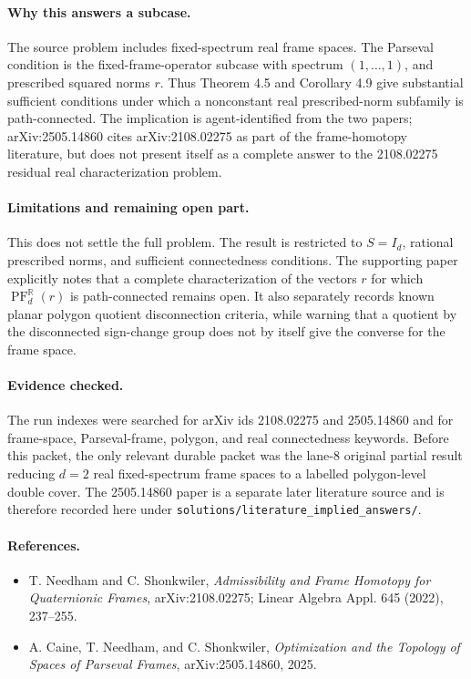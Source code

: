 \documentclass[11pt]{article}
\newcommand{\R}{\mathbb R}
\newcommand{\PF}{\operatorname{PF}}
\begin{document}
\paragraph{Why this answers a subcase.}
The source problem includes fixed-spectrum real frame spaces. The Parseval condition is the fixed-frame-operator subcase with spectrum \((1,\ldots,1)\), and prescribed squared norms \(r\). Thus Theorem 4.5 and Corollary 4.9 give substantial sufficient conditions under which a nonconstant real prescribed-norm subfamily is path-connected. The implication is agent-identified from the two papers; arXiv:2505.14860 cites arXiv:2108.02275 as part of the frame-homotopy literature, but does not present itself as a complete answer to the 2108.02275 residual real characterization problem.

\paragraph{Limitations and remaining open part.}
This does not settle the full problem. The result is restricted to \(S=I_d\), rational prescribed norms, and sufficient connectedness conditions. The supporting paper explicitly notes that a complete characterization of the vectors \(r\) for which \(\PF_d^\R(r)\) is path-connected remains open. It also separately records known planar polygon quotient disconnection criteria, while warning that a quotient by the disconnected sign-change group does not by itself give the converse for the frame space.

\paragraph{Evidence checked.}
The run indexes were searched for arXiv ids 2108.02275 and 2505.14860 and for frame-space, Parseval-frame, polygon, and real connectedness keywords. Before this packet, the only relevant durable packet was the lane-8 original partial result reducing \(d=2\) real fixed-spectrum frame spaces to a labelled polygon-level double cover. The 2505.14860 paper is a separate later literature source and is therefore recorded here under \texttt{solutions/literature\_implied\_answers/}.

\paragraph{References.}
\begin{itemize}
\item T. Needham and C. Shonkwiler, \emph{Admissibility and Frame Homotopy for Quaternionic Frames}, arXiv:2108.02275; Linear Algebra Appl. 645 (2022), 237--255.
\item A. Caine, T. Needham, and C. Shonkwiler, \emph{Optimization and the Topology of Spaces of Parseval Frames}, arXiv:2505.14860, 2025.
\end{itemize}
\end{document}
